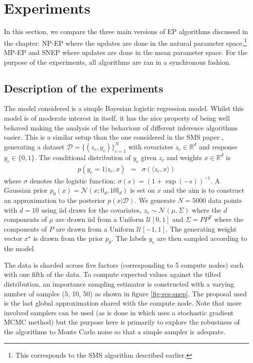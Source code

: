 \section{\label{dist-ep-exps}Experiments}

In this section, we compare the three main versions of EP algorithms discussed in the chapter: NP-EP where the updates are done in the natural parameter space,\footnote{This corresponds to the SMS algorithm described earlier.} MP-EP and SNEP where updates are done in the mean parameter space. For the purpose of the experiments, all algorithms are ran in a synchronous fashion. 

\subsection{Description of the experiments}

The model considered is a simple Bayesian logistic regression model. Whilst this model is of moderate interest in itself, it has the nice property of being well behaved making the analysis of the behaviour of different inference algorithms easier. This is a similar setup than the one considered in the SMS paper \citep{xu14}, generating a dataset $\mathcal D=\{(z_c, y_c)\}_{c=1}^N$ with covariates $z_c\in\mathbb R^d$ and response $y_c\in\{0,1\}$. The conditional distribution of $y_c$ given $z_c$ and weights $x\in\mathbb R^d$  is 
\begin{eqnarray}
    p(y_c=1|z_c, x) &=& \sigma(\langle z_c, x\rangle )
\end{eqnarray}
where $\sigma$ denotes the logistic function: $\sigma(s)= (1+\exp(-s))^{-1}$. A Gaussian prior $p_0(x) = \mathcal N(x; 0_d, 10\mathbb I_d)$ is set on $x$ and the aim is to construct an approximation to the posterior $p(x|\mathcal D)$. We generate $N=5000$ data points with $d=10$ using iid draws for the covariates, $z_c\sim\mathcal N(\mu, \Sigma)$ where the $d$ components of $\mu$ are drawn iid from a Uniform $\mathcal U[0,1]$ and $\Sigma=PP^T$ where the components of $P$ are drawn from a Uniform $\mathcal U[-1,1]$. The generating weight vector $x^\star$ is drawn from the prior $p_0$. The labels $y_c$ are then sampled according to the model.

The data is sharded across five factors (corresponding to 5 compute nodes) each with one fifth of the data. To compute expected values against the tilted distribution, an importance sampling estimator is constructed with a varying number of samples (5, 10, 50) as shown in figure \ref{fig-res-snep}. The proposal used is the last global approximation shared with the compute node. Note that more involved samplers can be used (as is done in \citet{hasenclever16} which uses a stochastic gradient MCMC method) but the purpose here is primarily to explore the robustness of the algorithms to Monte Carlo noise so that a simple sampler is adequate. 

